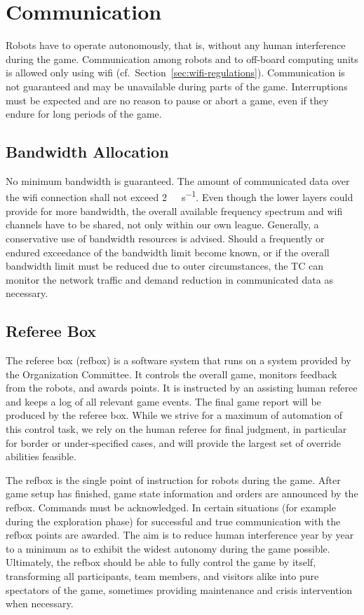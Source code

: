 \documentclass[12pt,twoside]{article}
\newcommand{\refsec}[1]{Section~\ref{#1}}
\begin{document}
\section{Communication}
\label{sec:communication}

Robots have to operate autonomously, that is, without any human
interference during the game. Communication among robots and to
off-board computing units is allowed only using wifi
(cf.~\refsec{sec:wifi-regulations}). Communication is not guaranteed
and may be unavailable during parts of the game. Interruptions must be
expected and are no reason to pause or abort a game, even if they
endure for long periods of the game.

\subsection{Bandwidth Allocation}
\label{sec:bandwidth}
No minimum bandwidth is guaranteed. The amount of communicated data
over the wifi connection shall not exceed
\SI[per-mode=symbol]{2}{\mega\bit\per\second}. Even though the lower
layers could provide for more bandwidth, the overall available
frequency spectrum and wifi channels have to be shared, not only
within our own league. Generally, a conservative use of bandwidth
resources is advised. Should a frequently or endured exceedance of the
bandwidth limit become known, or if the overall bandwidth limit must
be reduced due to outer circumstances, the TC can monitor the network
traffic and demand reduction in communicated data as necessary.

\subsection{Referee Box}
\label{sec:referee-box}
The referee box (refbox) is a software system that runs on a system
provided by the Organization Committee. It controls the overall game,
monitors feedback from the robots, and awards points. It is instructed
by an assisting human referee and keeps a log of all relevant game
events. The final game report will be produced by the referee
box. While we strive for a maximum of automation of this control task,
we rely on the human referee for final judgment, in particular for
border or under-specified cases, and will provide the largest set of
override abilities feasible.

The refbox is the single point of instruction for robots during the
game. After game setup has finished, game state information and orders
are announced by the refbox. Commands must be acknowledged. In certain
situations (for example during the exploration phase) for successful
and true communication with the refbox points are awarded. The aim is
to reduce human interference year by year to a minimum as to exhibit
the widest autonomy during the game possible. Ultimately, the refbox
should be able to fully control the game by itself, transforming all
participants, team members, and visitors alike into pure spectators of
the game, sometimes providing maintenance and crisis intervention when
necessary.
\end{document}
